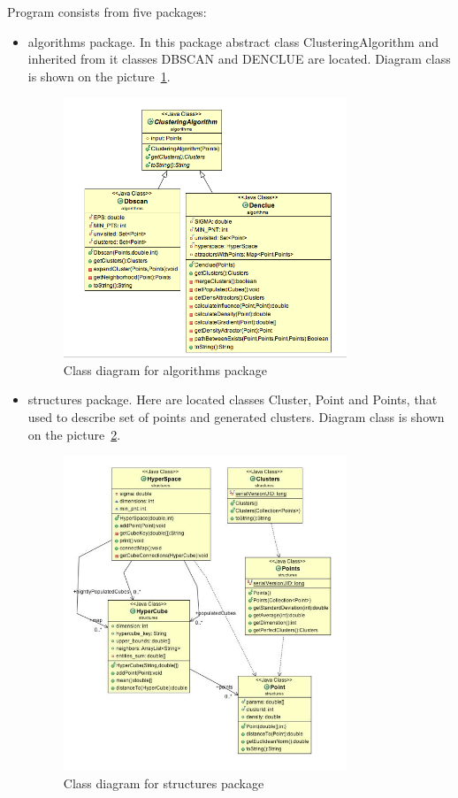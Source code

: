 \documentclass[12pt, a4paper, notitlepage, oneside]{article}
\begin{document}
Program consists from five packages:
\begin{itemize}
	\item algorithms package. In this package abstract class ClusteringAlgorithm and inherited from it classes DBSCAN and DENCLUE are located. Diagram class is shown on the picture~\ref{algorithms}.

	\begin{figure}[!ht]
 	\centering
	\includegraphics[width=0.8\textwidth]{images/algorithms_package.png}
 	\caption[]
	{Class diagram for algorithms package}
\label{algorithms}
	\end{figure}


	\item structures package. Here are located classes Cluster, Point and Points, that used  to describe set of points and generated clusters. Diagram class is shown on the picture~\ref{structures}.

	\begin{figure}[!ht]
 	\centering
	\includegraphics[width=0.8\textwidth]{images/structures_package.png}
 	\caption[]
	{Class diagram for structures package}
\label{structures}
	\end{figure}


\end{itemize}
\end{document}

